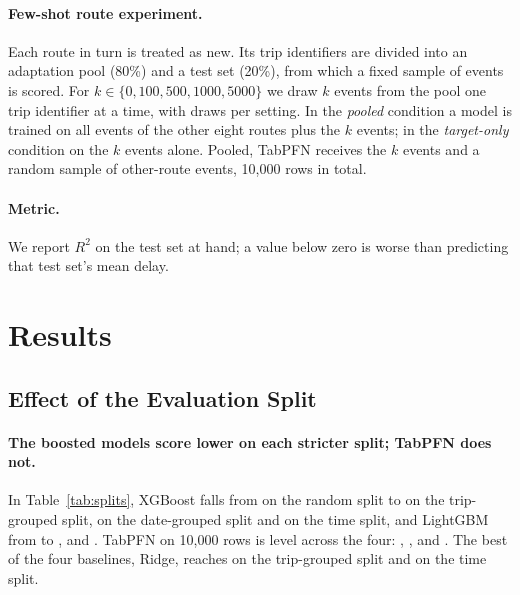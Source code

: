 \documentclass[runningheads]{llncs}
\begin{document}
\paragraph{Few-shot route experiment.}
Each route in turn is treated as new. Its trip identifiers are divided into
an adaptation pool (80\%) and a test set (20\%), from which a fixed sample of
\FewshotTestCap{} events is scored. For $k \in \{0, 100, 500, 1000, 5000\}$
we draw $k$ events from the pool one trip identifier at a time, with
\FewshotSeeds{} draws per setting. In the \emph{pooled} condition a model
is trained on all events of the other eight routes plus the $k$ events; in
the \emph{target-only} condition on the $k$ events alone. Pooled, TabPFN
receives the $k$ events and a random sample of other-route events, 10{,}000
rows in total.

\paragraph{Metric.}
We report $R^2$ on the test set at hand; a value below zero is worse than
predicting that test set's mean delay.

\section{Results}
\label{sec:results}

\subsection{Effect of the Evaluation Split}

\begin{table}[t]
\caption{$R^2$ by model, number of training rows and evaluation split (mean
$\pm$ standard deviation where repeated). ``all'' and ``10k'' give the number
of training rows; the 10k rows use the same random 10{,}000 training rows for
all three models. A dash marks a combination that was not run.}
\label{tab:splits}
\centering
\footnotesize
\setlength{\tabcolsep}{1.6pt}

\end{table}

\paragraph{The boosted models score lower on each stricter split; TabPFN
does not.}
In Table~\ref{tab:splits}, XGBoost falls from  on the
random split to  on the trip-grouped split,
 on the date-grouped split and  on the
time split, and LightGBM from  to
,  and . TabPFN
on 10{,}000 rows is level across the four: ,
,  and . The best of the four baselines,
Ridge, reaches  on the trip-grouped split and
 on the time split.
\end{document}
